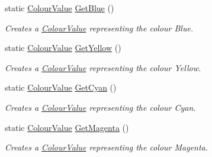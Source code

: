 \begin{DoxyCompactItemize}
static \hyperlink{classphys_1_1ColourValue}{ColourValue} \hyperlink{classphys_1_1ColourValue_a75c9d235524e52c9347085e445a53671}{GetBlue} ()
\begin{DoxyCompactList}\small\item\em Creates a \hyperlink{classphys_1_1ColourValue}{ColourValue} representing the colour Blue. \item\end{DoxyCompactList}\item 
static \hyperlink{classphys_1_1ColourValue}{ColourValue} \hyperlink{classphys_1_1ColourValue_a4139c90ab0369af1fafcb6b6eecaf3f3}{GetYellow} ()
\begin{DoxyCompactList}\small\item\em Creates a \hyperlink{classphys_1_1ColourValue}{ColourValue} representing the colour Yellow. \item\end{DoxyCompactList}\item 
static \hyperlink{classphys_1_1ColourValue}{ColourValue} \hyperlink{classphys_1_1ColourValue_a8ba924734eec3a913add8a40bc62ed1e}{GetCyan} ()
\begin{DoxyCompactList}\small\item\em Creates a \hyperlink{classphys_1_1ColourValue}{ColourValue} representing the colour Cyan. \item\end{DoxyCompactList}\item 
static \hyperlink{classphys_1_1ColourValue}{ColourValue} \hyperlink{classphys_1_1ColourValue_afba8b8dde8539ac97c3181dc763c9125}{GetMagenta} ()
\begin{DoxyCompactList}\small\item\em Creates a \hyperlink{classphys_1_1ColourValue}{ColourValue} representing the colour Magenta. \item\end{DoxyCompactList}\end{DoxyCompactItemize}
